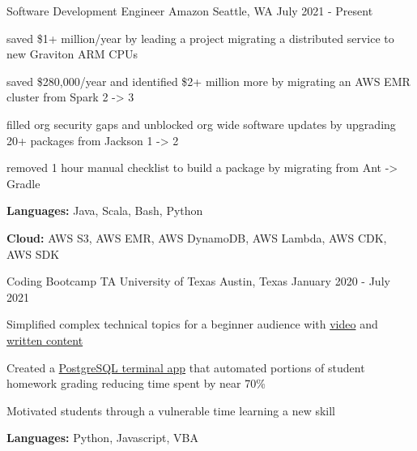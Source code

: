 

\begin{cventries}

  \cventry
    {Software Development Engineer} %
    {Amazon} %
    {Seattle, WA} %
    {July 2021 - Present} %
    {
      \begin{cvitems} %
        \item {saved \$1+ million/year by leading a project migrating a distributed service to new Graviton ARM CPUs}
        \item {saved \$280,000/year and identified \$2+ million more by migrating an AWS EMR cluster from Spark 2 -> 3}
        \item {filled org security gaps and unblocked org wide software updates by upgrading 20+ packages from Jackson 1 -> 2}
        \item {removed 1 hour manual checklist to build a package by migrating from Ant -> Gradle}
        \item {\textbf{Languages:} Java, Scala, Bash, Python}
        \item {\textbf{Cloud:} AWS S3, AWS EMR, AWS DynamoDB, AWS Lambda, AWS CDK, AWS SDK}
      \end{cvitems}
    }

  \cventry
    {Coding Bootcamp TA} %
    {University of Texas} %
    {Austin, Texas} %
    {January 2020 - July 2021} %
    {
      \begin{cvitems} %
        \item {Simplified complex technical topics for a beginner audience with \href{https://youtu.be/G4tDjGUD-T4}{video} and \href{https://www.linkedin.com/pulse/how-deal-knowledge-work-frustration-geoff-langenderfer/?trackingId=Z6YGiHpVRFi4PCNxybaPfw\%3D\%3D}{written content}}
        \item {Created a \href{https://youtu.be/ELCZ5dAS6Zg}{PostgreSQL terminal app} that automated portions of student homework grading reducing time spent by near 70\%}
        \item {Motivated students through a vulnerable time learning a new skill}
        \item {\textbf{Languages:} Python, Javascript, VBA}
      \end{cvitems}
    }

\end{cventries}
